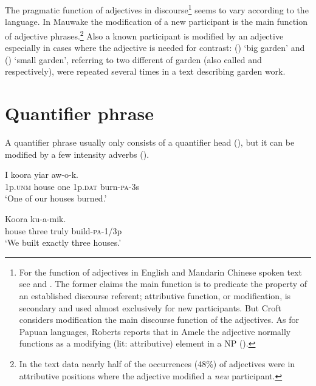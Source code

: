   

The pragmatic function of adjectives in discourse\footnote{For the function of adjectives in English and Mandarin Chinese spoken text see \citet{Thompson1988} and \citet{Croft1991}. The former claims the main function is to predicate the property of an established discourse referent; attributive function, or modification, is secondary and used almost exclusively for new participants. But Croft considers modification the main discourse function of the adjectives.  As for Papuan languages, Roberts reports that in Amele the adjective normally functions as a modifying (lit: attributive) element in a NP (\citeyear[318]{Roberts1987}).} seems to vary according to the language. In Mauwake the modification of a new participant is the main function of adjective phrases.\footnote{In the text data nearly half of the occurrences (48\%) of adjectives were in attributive positions where the adjective modified a \textit{new} participant.} Also a known participant is modified by an adjective especially in cases where the adjective is needed for contrast: ()  `big garden' and () \textstyleEmphasizedWords{} `small garden', referring to two different  of garden (also called  and  respectively), were repeated several times in a text describing garden work. 

\section{Quantifier phrase} \label{sec:4.3}
{}
A quantifier phrase usually only consists of a quantifier head  (), but it can be modified by a few intensity adverbs  (). 

\ea%
\label{ex:4:x845}
\gll I  koora    yiar  aw-o-k. \\
    1p.\textsc{unm}  house  one  1p.\textsc{dat}  burn-\textsc{pa}-3s  \\
\glt`One of our houses burned.'
\z

\ea%
\label{ex:4:x844}
\gll Koora     ku-a-mik. \\
   house  three  truly  build-\textsc{pa}-1/3p   \\
\glt`We built exactly three houses.'
\z

